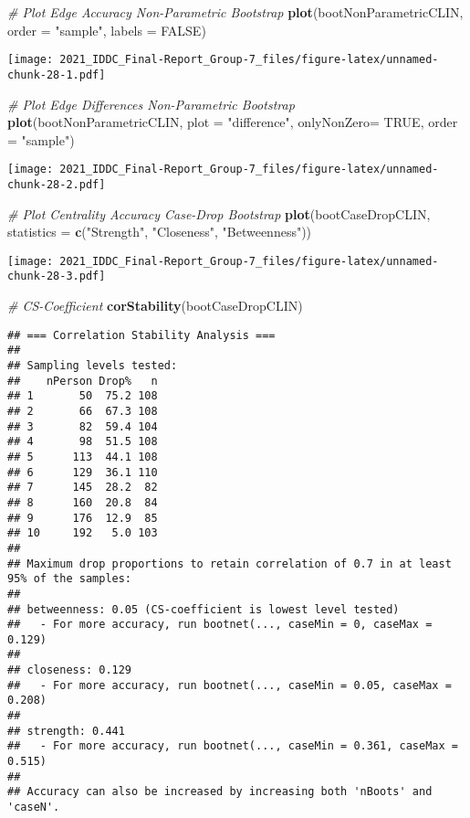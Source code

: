 \documentclass[
]{article}
\newenvironment{Shaded}{\begin{snugshade}}{\end{snugshade}}
\newcommand{\CommentTok}[1]{\textcolor[rgb]{0.56,0.35,0.01}{\textit{#1}}}
\newcommand{\DataTypeTok}[1]{\textcolor[rgb]{0.13,0.29,0.53}{#1}}
\newcommand{\KeywordTok}[1]{\textcolor[rgb]{0.13,0.29,0.53}{\textbf{#1}}}
\newcommand{\NormalTok}[1]{#1}
\newcommand{\OtherTok}[1]{\textcolor[rgb]{0.56,0.35,0.01}{#1}}
\newcommand{\StringTok}[1]{\textcolor[rgb]{0.31,0.60,0.02}{#1}}
\begin{document}
\begin{Shaded}
\begin{Highlighting}[]
\CommentTok{# Plot Edge Accuracy Non-Parametric Bootstrap}
\KeywordTok{plot}\NormalTok{(bootNonParametricCLIN,}
     \DataTypeTok{order =} \StringTok{"sample"}\NormalTok{,}
     \DataTypeTok{labels =} \OtherTok{FALSE}\NormalTok{)}
\end{Highlighting}
\end{Shaded}

\texttt{[image: 2021\_IDDC\_Final-Report\_Group-7\_files/figure-latex/unnamed-chunk-28-1.pdf]}

\begin{Shaded}
\begin{Highlighting}[]
\CommentTok{# Plot Edge Differences Non-Parametric Bootstrap}
\KeywordTok{plot}\NormalTok{(bootNonParametricCLIN,}
     \DataTypeTok{plot =} \StringTok{"difference"}\NormalTok{,}
     \DataTypeTok{onlyNonZero=} \OtherTok{TRUE}\NormalTok{,}
     \DataTypeTok{order =} \StringTok{"sample"}\NormalTok{)}
\end{Highlighting}
\end{Shaded}

\texttt{[image: 2021\_IDDC\_Final-Report\_Group-7\_files/figure-latex/unnamed-chunk-28-2.pdf]}

\begin{Shaded}
\begin{Highlighting}[]
\CommentTok{# Plot Centrality Accuracy Case-Drop Bootstrap}
\KeywordTok{plot}\NormalTok{(bootCaseDropCLIN,}
     \DataTypeTok{statistics =} \KeywordTok{c}\NormalTok{(}\StringTok{"Strength"}\NormalTok{, }\StringTok{"Closeness"}\NormalTok{, }\StringTok{"Betweenness"}\NormalTok{))}
\end{Highlighting}
\end{Shaded}

\texttt{[image: 2021\_IDDC\_Final-Report\_Group-7\_files/figure-latex/unnamed-chunk-28-3.pdf]}

\begin{Shaded}
\begin{Highlighting}[]
\CommentTok{# CS-Coefficient}
\KeywordTok{corStability}\NormalTok{(bootCaseDropCLIN)}
\end{Highlighting}
\end{Shaded}

\begin{verbatim}
## === Correlation Stability Analysis === 
## 
## Sampling levels tested:
##    nPerson Drop%   n
## 1       50  75.2 108
## 2       66  67.3 108
## 3       82  59.4 104
## 4       98  51.5 108
## 5      113  44.1 108
## 6      129  36.1 110
## 7      145  28.2  82
## 8      160  20.8  84
## 9      176  12.9  85
## 10     192   5.0 103
## 
## Maximum drop proportions to retain correlation of 0.7 in at least 95% of the samples:
## 
## betweenness: 0.05 (CS-coefficient is lowest level tested)
##   - For more accuracy, run bootnet(..., caseMin = 0, caseMax = 0.129) 
## 
## closeness: 0.129 
##   - For more accuracy, run bootnet(..., caseMin = 0.05, caseMax = 0.208) 
## 
## strength: 0.441 
##   - For more accuracy, run bootnet(..., caseMin = 0.361, caseMax = 0.515) 
## 
## Accuracy can also be increased by increasing both 'nBoots' and 'caseN'.
\end{verbatim}
\end{document}
